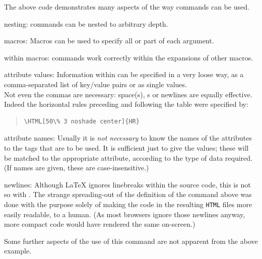 \noindent
The above code demonstrates many aspects of the way 
commands can be used.
%
\begin{htmllist}
\item [nesting: ] 
 commands can be nested to arbitrary depth.
%
\item [macros: ] 
Macros can be used to specify all or part of each argument.
%
\item [within macros: ] 
 commands work correctly within the expansions of other macros.
%
\item [attribute values: ]
Information within  can be specified in a very
loose way, as a comma-separated list of key/value pairs
or as single values. \\
Not even the commas are necessary: space(s), s 
or newlines are equally effective.
Indeed the horizontal rules preceding and following the table were 
specified by:
\begin{quote}
\begin{verbatim}
\HTML[50\% 3 noshade center]{HR}
\end{verbatim}
\end{quote}
%
\item [attribute names: ]
Usually it is \emph{not necessary} to know the names of the
attributes to the tags that are to be used. It is sufficient
just to give the values; these will be matched to the
appropriate attribute, according to the type of data required.
(If names are given, these are case-insensitive.)
%
\item [newlines: ] 
Although \LaTeX{} ignores linebreaks within the source code,
this is not so with \latextohtml. 
The strange spreading-out of the definition of the
 command above was done with the purpose
solely of making the code in the resulting \texttt{HTML} files 
more easily readable, to a human.
(As most browsers ignore those newlines anyway, 
more compact code would have rendered the same on-screen.)
\end{htmllist}

\medskip\noindent
Some further aspects of the use of this 
command are not apparent from the above example. 


